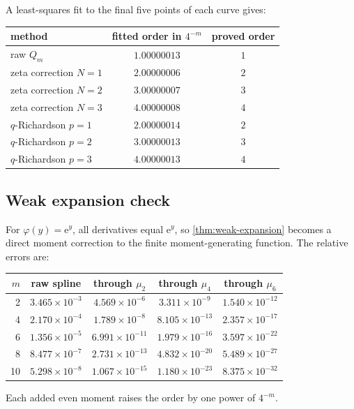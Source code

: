 \documentclass[11pt,oneside]{article}
\numberwithin{equation}{section}
\theoremstyle{definition}
\theoremstyle{remark}
\newcommand{\e}{\mathrm e}
\begin{document}
A least-squares fit to the final five points of each curve gives:
\begin{center}
\small
\begin{tabular}{@{}lcc@{}}
\toprule
method & fitted order in $4^{-m}$ & proved order \\
\midrule
raw $Q_m$ & $1.00000013$ & $1$\\
zeta correction $N=1$ & $2.00000006$ & $2$\\
zeta correction $N=2$ & $3.00000007$ & $3$\\
zeta correction $N=3$ & $4.00000008$ & $4$\\
$q$-Richardson $p=1$ & $2.00000014$ & $2$\\
$q$-Richardson $p=2$ & $3.00000013$ & $3$\\
$q$-Richardson $p=3$ & $4.00000013$ & $4$\\
\bottomrule
\end{tabular}
\end{center}

\subsection{Weak expansion check}

For $\varphi(y)=\e^y$, all derivatives equal $\e^y$, so
\cref{thm:weak-expansion} becomes a direct moment correction to the finite moment-generating
function.  The relative errors are:
\begin{center}
\small
\begin{tabular}{@{}rcccc@{}}
\toprule
$m$ & raw spline & through $\mu_2$ & through $\mu_4$ & through $\mu_6$\\
\midrule
2 & $3.465\times10^{-3}$ & $4.569\times10^{-6}$ & $3.311\times10^{-9}$ & $1.540\times10^{-12}$\\
4 & $2.170\times10^{-4}$ & $1.789\times10^{-8}$ & $8.105\times10^{-13}$ & $2.357\times10^{-17}$\\
6 & $1.356\times10^{-5}$ & $6.991\times10^{-11}$ & $1.979\times10^{-16}$ & $3.597\times10^{-22}$\\
8 & $8.477\times10^{-7}$ & $2.731\times10^{-13}$ & $4.832\times10^{-20}$ & $5.489\times10^{-27}$\\
10 & $5.298\times10^{-8}$ & $1.067\times10^{-15}$ & $1.180\times10^{-23}$ & $8.375\times10^{-32}$\\
\bottomrule
\end{tabular}
\end{center}
Each added even moment raises the order by one power of $4^{-m}$.
\end{document}

